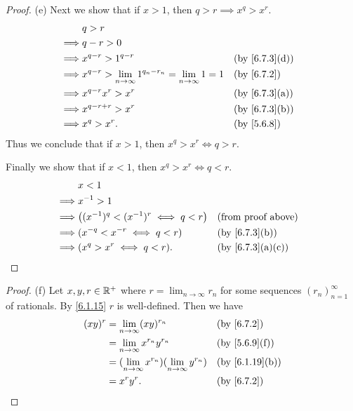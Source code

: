 \begin{proof}{(e)}
  Next we show that if \(x > 1\), then \(q > r \implies x^q > x^r\).
  \begin{align*}
             & q > r                                                                                                      \\
    \implies & q - r > 0                                                                                                  \\
    \implies & x^{q - r} > 1^{q - r}                                                     &  & \text{(by \cref{6.7.3}(d))} \\
    \implies & x^{q - r} > \lim_{n \to \infty} 1^{q_n - r_n} = \lim_{n \to \infty} 1 = 1 &  & \text{(by \cref{6.7.2})}    \\
    \implies & x^{q - r} x^r > x^r                                                       &  & \text{(by \cref{6.7.3}(a))} \\
    \implies & x^{q - r + r} > x^r                                                       &  & \text{(by \cref{6.7.3}(b))} \\
    \implies & x^q > x^r.                                                                &  & \text{(by \cref{5.6.8})}
  \end{align*}
  Thus we conclude that if \(x > 1\), then \(x^q > x^r \iff q > r\).

  Finally we show that if \(x < 1\), then \(x^q > x^r \iff q < r\).
  \begin{align*}
             & x < 1                                                                            \\
    \implies & x^{-1} > 1                                                                       \\
    \implies & \big((x^{-1})^q < (x^{-1})^r \iff q < r\big) &  & \text{(from proof above)}      \\
    \implies & (x^{-q} < x^{-r} \iff q < r)                 &  & \text{(by \cref{6.7.3}(b))}    \\
    \implies & (x^q > x^r \iff q < r).                      &  & \text{(by \cref{6.7.3}(a)(c))}
  \end{align*}
\end{proof}

\begin{proof}{(f)}
  Let \(x, y, r \in \mathbb{R}^+\) where \(r = \lim_{n \to \infty} r_n\) for some sequences \((r_n)_{n = 1}^\infty\) of rationals.
  By \cref{6.1.15} \(r\) is well-defined.
  Then we have
  \begin{align*}
    (xy)^r & = \lim_{n \to \infty} (xy)^{r_n}                             &  & \text{(by \cref{6.7.2})}     \\
           & = \lim_{n \to \infty} x^{r_n} y^{r_n}                        &  & \text{(by \cref{5.6.9}(f))}  \\
           & = (\lim_{n \to \infty} x^{r_n})(\lim_{n \to \infty} y^{r_n}) &  & \text{(by \cref{6.1.19}(b))} \\
           & = x^r y^r.                                                   &  & \text{(by \cref{6.7.2})}
  \end{align*}
\end{proof}


